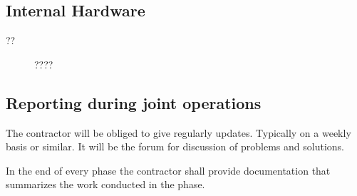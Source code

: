 \subsection{Internal Hardware}
\begin{description}
\item[??] ???? 
\end{description}


\subsection{Reporting during joint operations}
The contractor will be obliged to give regularly updates. Typically on a weekly basis or similar. It will be the forum for discussion of problems and solutions. 

In the end of every phase the contractor shall provide documentation that summarizes the work conducted in the phase.